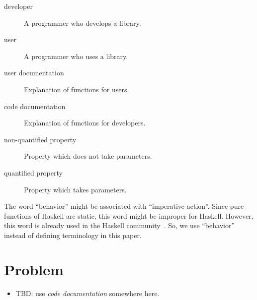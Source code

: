 \documentclass[preprint]{sigplanconf}
\begin{document}
\begin{description}
\item[developer]
    A programmer who develops a library.

\item[user]
    A programmer who uses a library.


\item[user documentation]
    Explanation of functions for users.
\item[code documentation]
    Explanation of functions for developers.

\item[non-quantified property]
    Property which does not take parameters.

\item[quantified property]
    Property which takes parameters.

\end{description}

\noindent The word ``behavior'' might be associated with ``imperative
action''.  Since pure functions of Haskell are static, this word might
be improper for Haskell.  However, this word is already used in the
Haskell community~\cite{typeclassopedia}.  So, we use ``behavior''
instead of defining terminology in this paper.

%
%
%

\section{Problem}
\label{sec:problem}
\begin{itemize}
    \item TBD: use \emph{code documentation} somewhere here.
\end{itemize}
\end{document}
